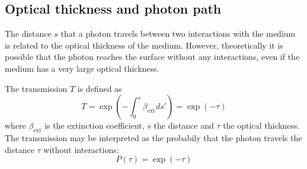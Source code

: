 \documentclass[12pt,twoside,a4paper]{article}
\begin{document}
\subsection{Optical thickness and photon path}

The distance $s$ that a photon travels between two interactions
with the medium is related to the optical thickness of the
medium. However, theoretically it is possible that the photon reaches the
surface without any interactions, even if the medium has a very
large optical thickness. 

The transmission $T$ is defined as
\begin{equation}
  T=\exp({-\int_{0}^{s} \beta_\mathrm{ext} ds'})=\exp({-\tau})
\end{equation}
where $\beta_\mathrm{ext}$ is the extinction coefficient, $s$ the distance
and $\tau$ the optical thickness. The transmission may be interpreted as the
probabily that the photon travels the distance $\tau$ without
interactions:
\begin{equation}
  P(\tau)=\exp(-\tau) 
\end{equation}
\end{document}
